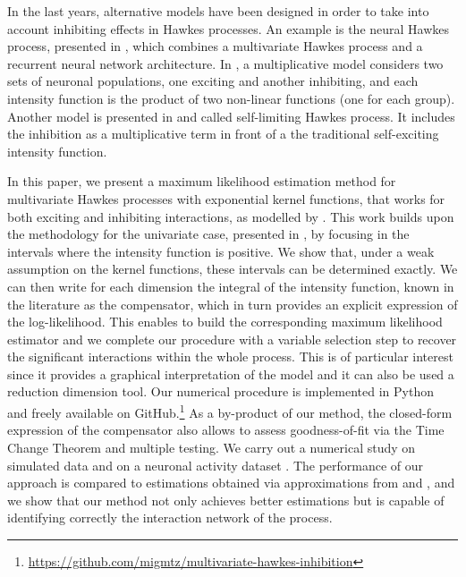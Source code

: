 In the last years,
alternative models have been designed in order to take into account inhibiting effects in Hawkes processes.
An example is the neural Hawkes process, presented in \textcite{Mei2017,Zuo2021}, which combines a multivariate Hawkes process and a recurrent neural network architecture.
In \textcite{Duval2021}, a multiplicative model considers two sets of neuronal populations, one exciting and another inhibiting, and each intensity function is the product of two non-linear functions (one for each group).
Another model is presented in \textcite{Olinde2020} and called self-limiting Hawkes process.
It includes the inhibition as a multiplicative term in front of a the traditional self-exciting intensity function. 

In this paper, we present a maximum likelihood estimation method for multivariate Hawkes processes with exponential kernel functions, that works for both exciting and inhibiting interactions, as modelled by \textcite{Bremaud1996, Chen2017}.
This work builds upon the methodology for the univariate case, presented in \textcite{bonnet2021}, by focusing in the intervals where the intensity function is positive.
We show that, under a weak assumption on the kernel functions, these intervals can be determined exactly.
We can then write for each dimension the integral of the intensity function, known in the literature as the compensator, which in turn provides an explicit expression of the log-likelihood.
This enables to build the corresponding maximum likelihood estimator and we complete our procedure with a variable selection step to recover the significant interactions within the whole process. This is of particular interest since it provides a graphical interpretation of the model and it can also be used a reduction dimension tool.
Our numerical procedure is implemented
in Python and freely available on GitHub.\footnote{\url{https://github.com/migmtz/multivariate-hawkes-inhibition}}
As a by-product of our method, the closed-form expression of the compensator also allows to assess goodness-of-fit via the Time Change Theorem and multiple testing.
We carry out a numerical study on simulated data and on a neuronal activity dataset \parencite{Petersen2016,Radosevic2019}.
The performance of our approach is compared to estimations obtained via approximations from \textcite{Bacry2020} and \textcite{Lemonnier2014}, and we show that our method not only achieves better estimations but is capable of identifying correctly the interaction network of the process.

